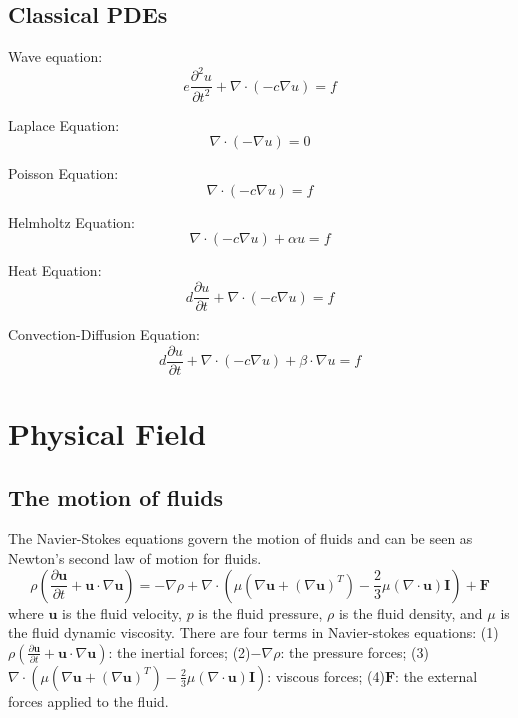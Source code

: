 \documentclass[%
 reprint,
 amsmath,amssymb,
 aps,
rmp,
]{revtex4-1}
\begin{document}
\subsection{Classical PDEs}
Wave equation:
\begin{equation}
e\frac{\partial^2 u}{\partial t^2} + \nabla\cdot(-c\nabla u) =f
\label{eq:waveequation}
\end{equation}

Laplace Equation:
\begin{equation}
\nabla\cdot(-\nabla u)=0
\label{eq:laplaceequation}
\end{equation}

Poisson Equation:
\begin{equation}
\nabla\cdot(- c\nabla u)=f
\label{eq:poissonequation}
\end{equation}

Helmholtz Equation:
\begin{equation}
\nabla\cdot(- c\nabla u) + \alpha u =f
\label{eq:helmholtzequation}
\end{equation}

Heat Equation:
\begin{equation}
d \frac{\partial u}{\partial t} + \nabla\cdot(- c\nabla u) =f
\label{eq:heatequation}
\end{equation}

Convection-Diffusion Equation:
\begin{equation}
d \frac{\partial u}{\partial t} + \nabla\cdot(- c\nabla u)  + \beta\cdot\nabla u=f
\label{eq:convectiondiffusionequation}
\end{equation}

\section{Physical Field}

\subsection{The motion of fluids}
The Navier-Stokes equations govern the motion of fluids and can be seen as Newton's second law of motion for fluids.
\begin{equation}
\rho (\frac{\partial \bm{u}}{\partial t} + \bm{u}\cdot\nabla\bm{u})=  -\nabla\rho + \nabla\cdot(\mu(\nabla\bm{u} + (\nabla\bm{u})^T) - \frac{2}{3}\mu(\nabla\cdot\bm{u})\bm{I}) + \bm{F}
\label{eq:navierstokesequation}
\end{equation}
where $\bm{u}$ is the fluid velocity, $p$ is the fluid pressure, $\rho$ is the fluid density, and $\mu$ is the fluid dynamic viscosity. There are four terms in Navier-stokes equations: (1) $\rho (\frac{\partial \bm{u}}{\partial t} + \bm{u}\cdot\nabla\bm{u})$: the inertial forces; (2)$-\nabla\rho$: the pressure forces; (3)$\nabla\cdot(\mu(\nabla\bm{u} + (\nabla\bm{u})^T) - \frac{2}{3}\mu(\nabla\cdot\bm{u})\bm{I})$: viscous forces; (4)$\bm{F}$: the external forces applied to the fluid.
\end{document}
